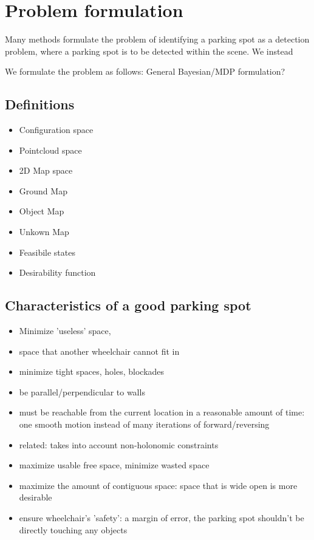 \section{Problem formulation}

Many methods formulate the problem of identifying a parking spot as a detection
problem, where a parking spot is to be detected within the scene.
We instead 

We formulate the problem as follows: General Bayesian/MDP formulation?

\subsection{Definitions}

\begin{itemize}
\item Configuration space
\item Pointcloud space
\item 2D Map space
\item Ground Map
\item Object Map
\item Unkown Map
\item Feasibile states
\item Desirability function
\end{itemize}

\subsection{Characteristics of a good parking spot}
\begin{itemize}
\item Minimize 'useless' space,
\item space that another wheelchair cannot fit in 
\item minimize tight spaces, holes, blockades
\item be parallel/perpendicular to walls
\item must be reachable from the current location in a reasonable amount of
time: one smooth motion instead of many iterations of forward/reversing
\item related: takes into account non-holonomic constraints
\item maximize usable free space, minimize wasted space
\item maximize the amount of contiguous space: space that is wide open is more
desirable
\item ensure wheelchair's 'safety': a margin of error, the parking spot
shouldn't be directly touching any objects
\end{itemize}

